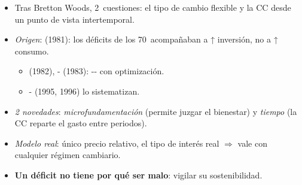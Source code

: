 \documentclass{article}
\begin{document}
\begin{columnas}
\begin{itemize}
\item Tras Bretton Woods, 2~cuestiones: el tipo de cambio flexible  y la CC desde un punto de vista intertemporal.
\item \emph{Origen}:  (1981): los déficits de los 70~acompañaban a ↑ inversión, no a ↑ consumo.
  \begin{itemize}
  \item {} (1982), - (1983): -- con optimización.
  \item {}- (1995, 1996) lo sistematizan.
  \end{itemize}
\item \emph{2 novedades}: \emph{microfundamentación} (permite juzgar el bienestar) y \emph{tiempo} (la CC reparte el gasto entre periodos).
\item \emph{Modelo real}: único precio relativo, el tipo de interés real $\Rightarrow$ vale con cualquier régimen cambiario.
\item \textbf{Un déficit no tiene por qué ser malo}: vigilar su sostenibilidad.
\end{itemize}


\end{columnas}
\end{document}
